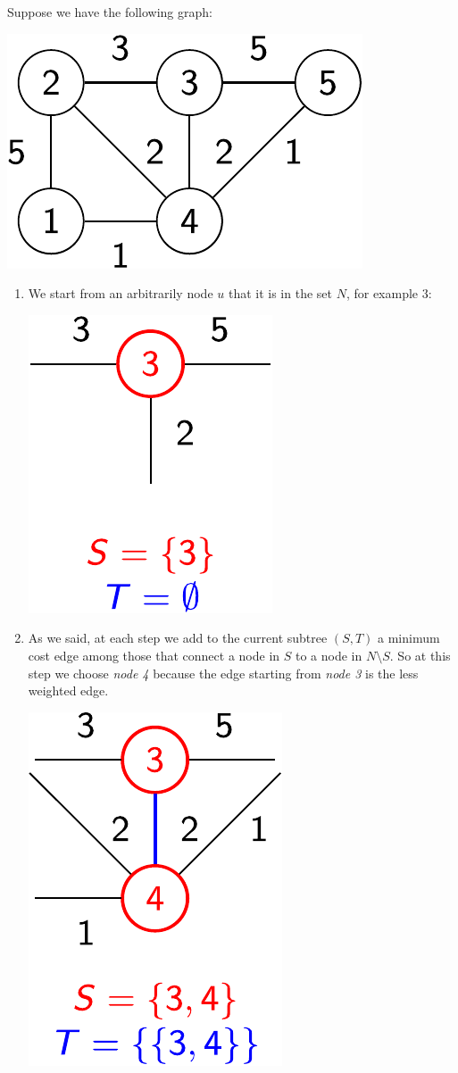 \begin{examplebox}
    Suppose we have the following graph:
    \begin{center}
        \includegraphics[width=.3\textwidth]{img/prims-alg-1.pdf}
    \end{center}

    \begin{enumerate}
        \item We start from an arbitrarily node $u$ that it is in the set $N$, for example $3$:
        \begin{center}
            \includegraphics[width=.2\textwidth]{img/prims-alg-2.pdf}
        \end{center}

        \item As we said, at each step we add to the current subtree $\left(S, T\right)$ a minimum cost edge among those that connect a node in $S$ to a node in $N \setminus S$. So at this step we choose \emph{node 4} because the edge starting from \emph{node 3} is the less weighted edge.
        \begin{center}
            \includegraphics[width=.2\textwidth]{img/prims-alg-3.pdf}
        \end{center}


\end{enumerate}
\end{examplebox}
